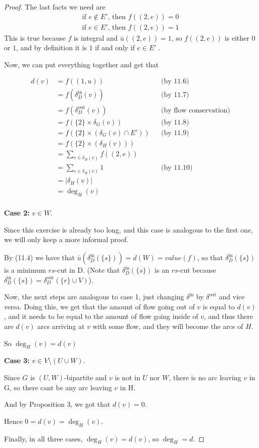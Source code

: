 \documentclass[a4paper,10pt, leqno]{article}
\theoremstyle{definition}
\begin{document}
\begin{proof}
The last facts we need are 
\begin{align*}
 \tag{11.9}
 \text{if } e \notin E' \text{, then } f((2, e)) = 0 \\
 \tag{11.10}
 \text{if } e \in E' \text{, then } f((2, e)) = 1 
\end{align*}
This is true because $f$ is integral and $\bar{u}((2,e)) = 1$, so $f((2, e))$ is either $0$ or $1$, and by definition it is $1$ if and only if $e \in E'$ .


Now, we can put everything together and get that

\begin{align*}
 d(v) 
 &= f((1, u)) &&\text{(by 11.6)}  \\
 &= f(\delta_D^{\text{in}}(v)) &&\text{(by 11.7)} \\
 &= f(\delta_D^{\text{out}}(v)) &&\text{(by flow conservation)} \\
 &= f(\{2\} \times \delta_G(v)) &&\text{(by 11.8)} \\
 &= f(\{2\} \times (\delta_G(v) \cap E')) &&\text{(by 11.9)} \\
 &= f(\{2\} \times (\delta_H(v))) \\ 
 &= \sum_{e \in \delta_H(v)}{f((2, e))} \\
 &= \sum_{e \in \delta_H(v)}{1} &&\text{(by 11.10)} \\
 &= |\delta_H(v)| \\
 &= \deg_H(v) \\
\end{align*}

\textbf{Case 2: }$v \in W$.

Since this exercise is already too long, and this case is analogous to the first one, we will only keep a more informal proof.


By (11.4) we have that $\bar{u}(\delta_D^\text{in}(\{s\})) = d(W) = value(f)$, so that $\delta_D^\text{in}(\{s\})$ is a minimum $rs$-cut in D. (Note that $\delta_D^\text{in}(\{s\})$ is an $rs$-cut because $\delta_D^\text{in}(\{s\}) = \delta_D^\text{out}(\{r\} \cup V)$).

Now, the next steps are analogous to case 1, just changing $\delta^{\text{in}}$ by $\delta^{\text{out}}$ and vice versa.
Doing this, we get that the amount of flow going out of $v$ is equal to $d(v)$, and it needs to be equal to the amount of flow going inside of $v$, and thus there are $d(v)$ arcs arriving at $v$ with some flow, and they will become the arcs of $H$.

So $\deg_H(v) = d(v)$

\textbf{Case 3: }$v \in V \setminus(U \cup W)$.

Since $G$ is $(U, W)$-bipartite and $v$ is not in $U$ nor $W$, there is no arc leaving $v$ in G, so there cant be any arc leaving $v$ in H.

And by Proposition 3, we got that $d(v) = 0$.

Hence $0 = d(v) = \deg_H(v)$.

Finally, in all three cases, $\deg_H(v) = d(v)$, so $\deg_H = d$.
\end{proof}
\end{document}
